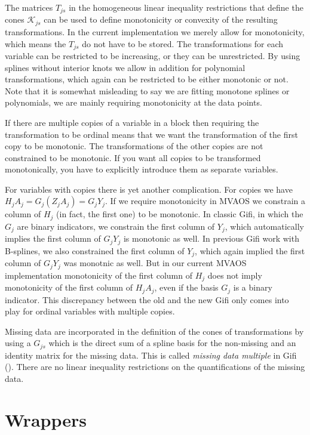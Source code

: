 \documentclass[
  12pt,
  letterpaper,
]{scrbook}
\begin{document}
The matrices \(T_{js}\) in the homogeneous linear inequality
restrictions that define the cones \(\mathcal{K}_{js}\) can be used to
define monotonicity or convexity of the resulting transformations. In
the current implementation we merely allow for monotonicity, which means
the \(T_{js}\) do not have to be stored. The transformations for each
variable can be restricted to be increasing, or they can be
unrestricted. By using splines without interior knots we allow in
addition for polynomial transformations, which again can be restricted
to be either monotonic or not. Note that it is somewhat misleading to
say we are fitting monotone splines or polynomials, we are mainly
requiring monotonicity at the data points.

If there are multiple copies of a variable in a block then requiring the
transformation to be ordinal means that we want the transformation of
the first copy to be monotonic. The transformations of the other copies
are not constrained to be monotonic. If you want all copies to be
transformed monotonically, you have to explicitly introduce them as
separate variables.

For variables with copies there is yet another complication. For copies
we have \(H_jA_j=G_j(Z_jA_j)=G_jY_j\). If we require monotonicity in
MVAOS we constrain a column of \(H_j\) (in fact, the first one) to be
monotonic. In classic Gifi, in which the \(G_j\) are binary indicators,
we constrain the first column of \(Y_j\), which automatically implies
the first column of \(G_jY_j\) is monotonic as well. In previous Gifi
work with B-splines, we also constrained the first column of \(Y_j\),
which again implied the first column of \(G_jY_j\) was monotnic as well.
But in our current MVAOS implementation monotonicity of the first column
of \(H_j\) does not imply monotonicity of the first column of
\(H_jA_j\), even if the basis \(G_j\) is a binary indicator. This
discrepancy between the old and the new Gifi only comes into play for
ordinal variables with multiple copies.

Missing data are incorporated in the definition of the cones of
transformations by using a \(G_{js}\) which is the direct sum of a
spline basis for the non-missing and an identity matrix for the missing
data. This is called \emph{missing data multiple} in Gifi
(). There are no linear inequality
restrictions on the quantifications of the missing data.

\section{Wrappers}\label{wrappers}
\end{document}
